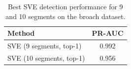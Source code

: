 \begin{table}[H]
\centering
\caption{Best SVE detection performance for 9 and 10 segments on the broach dataset.}
\begin{tabular}{lc}
\hline
Method & PR-AUC \\
\hline
SVE (9 segments, top-1) & 0.992 \\
SVE (10 segments, top-1) & 0.956 \\
\hline
\end{tabular}
\label{tab:broach_sve_detection_performance}
\end{table}